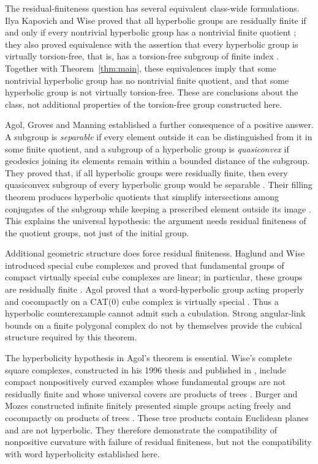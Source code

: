 The residual-finiteness question has several equivalent class-wide formulations. Ilya Kapovich and Wise proved that all hyperbolic groups are residually finite if and only if every nontrivial hyperbolic group has a nontrivial finite quotient \cite[Theorem~1.2]{KW2000}; they also proved equivalence with the assertion that every hyperbolic group is virtually torsion-free, that is, has a torsion-free subgroup of finite index \cite[Theorem~5.1]{KW2000}. Together with Theorem~\ref{thm:main}, these equivalences imply that some nontrivial hyperbolic group has no nontrivial finite quotient, and that some hyperbolic group is not virtually torsion-free. These are conclusions about the class, not additional properties of the torsion-free group constructed here.

Agol, Groves and Manning established a further consequence of a positive answer. A subgroup is \emph{separable} if every element outside it can be distinguished from it in some finite quotient, and a subgroup of a hyperbolic group is \emph{quasiconvex} if geodesics joining its elements remain within a bounded distance of the subgroup. They proved that, if all hyperbolic groups were residually finite, then every quasiconvex subgroup of every hyperbolic group would be separable \cite[Theorem~0.1]{AGM2009}. Their filling theorem produces hyperbolic quotients that simplify intersections among conjugates of the subgroup while keeping a prescribed element outside its image \cite[Theorem~0.6]{AGM2009}. This explains the universal hypothesis: the argument needs residual finiteness of the quotient groups, not just of the initial group.

Additional geometric structure does force residual finiteness. Haglund and Wise introduced special cube complexes and proved that fundamental groups of compact virtually special cube complexes are linear; in particular, these groups are residually finite \cite[Theorem~4.4]{HW2008}. Agol proved that a word-hyperbolic group acting properly and cocompactly on a CAT(0) cube complex is virtually special \cite[Theorem~1.1]{Agol2013}. Thus a hyperbolic counterexample cannot admit such a cubulation. Strong angular-link bounds on a finite polygonal complex do not by themselves provide the cubical structure required by this theorem.

The hyperbolicity hypothesis in Agol's theorem is essential. Wise's complete square complexes, constructed in his 1996 thesis and published in \cite{Wise2007}, include compact nonpositively curved examples whose fundamental groups are not residually finite and whose universal covers are products of trees \cite[Theorem~3.8 and Main Theorem~7.5]{Wise2007}. Burger and Mozes constructed infinite finitely presented simple groups acting freely and cocompactly on products of trees \cite{BM1997}. These tree products contain Euclidean planes and are not hyperbolic. They therefore demonstrate the compatibility of nonpositive curvature with failure of residual finiteness, but not the compatibility with word hyperbolicity established here.
